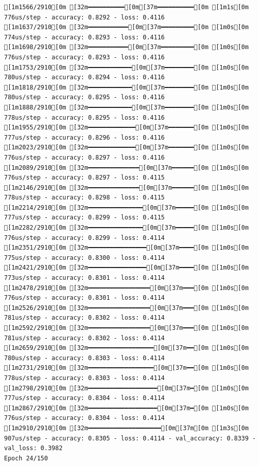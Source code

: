 \documentclass[
  letterpaper,
  DIV=11,
  numbers=noendperiod]{scrartcl}
\begin{document}
\begin{verbatim}
[1m1566/2910[0m [32m━━━━━━━━━━[0m[37m━━━━━━━━━━[0m [1m1s[0m 776us/step - accuracy: 0.8292 - loss: 0.4116
[1m1637/2910[0m [32m━━━━━━━━━━━[0m[37m━━━━━━━━━[0m [1m0s[0m 774us/step - accuracy: 0.8293 - loss: 0.4116
[1m1698/2910[0m [32m━━━━━━━━━━━[0m[37m━━━━━━━━━[0m [1m0s[0m 776us/step - accuracy: 0.8293 - loss: 0.4116
[1m1753/2910[0m [32m━━━━━━━━━━━━[0m[37m━━━━━━━━[0m [1m0s[0m 780us/step - accuracy: 0.8294 - loss: 0.4116
[1m1818/2910[0m [32m━━━━━━━━━━━━[0m[37m━━━━━━━━[0m [1m0s[0m 780us/step - accuracy: 0.8295 - loss: 0.4116
[1m1888/2910[0m [32m━━━━━━━━━━━━[0m[37m━━━━━━━━[0m [1m0s[0m 778us/step - accuracy: 0.8295 - loss: 0.4116
[1m1955/2910[0m [32m━━━━━━━━━━━━━[0m[37m━━━━━━━[0m [1m0s[0m 777us/step - accuracy: 0.8296 - loss: 0.4116
[1m2023/2910[0m [32m━━━━━━━━━━━━━[0m[37m━━━━━━━[0m [1m0s[0m 776us/step - accuracy: 0.8297 - loss: 0.4116
[1m2089/2910[0m [32m━━━━━━━━━━━━━━[0m[37m━━━━━━[0m [1m0s[0m 776us/step - accuracy: 0.8297 - loss: 0.4115
[1m2146/2910[0m [32m━━━━━━━━━━━━━━[0m[37m━━━━━━[0m [1m0s[0m 778us/step - accuracy: 0.8298 - loss: 0.4115
[1m2214/2910[0m [32m━━━━━━━━━━━━━━━[0m[37m━━━━━[0m [1m0s[0m 777us/step - accuracy: 0.8299 - loss: 0.4115
[1m2282/2910[0m [32m━━━━━━━━━━━━━━━[0m[37m━━━━━[0m [1m0s[0m 776us/step - accuracy: 0.8299 - loss: 0.4114
[1m2351/2910[0m [32m━━━━━━━━━━━━━━━━[0m[37m━━━━[0m [1m0s[0m 775us/step - accuracy: 0.8300 - loss: 0.4114
[1m2421/2910[0m [32m━━━━━━━━━━━━━━━━[0m[37m━━━━[0m [1m0s[0m 773us/step - accuracy: 0.8301 - loss: 0.4114
[1m2478/2910[0m [32m━━━━━━━━━━━━━━━━━[0m[37m━━━[0m [1m0s[0m 776us/step - accuracy: 0.8301 - loss: 0.4114
[1m2526/2910[0m [32m━━━━━━━━━━━━━━━━━[0m[37m━━━[0m [1m0s[0m 781us/step - accuracy: 0.8302 - loss: 0.4114
[1m2592/2910[0m [32m━━━━━━━━━━━━━━━━━[0m[37m━━━[0m [1m0s[0m 781us/step - accuracy: 0.8302 - loss: 0.4114
[1m2659/2910[0m [32m━━━━━━━━━━━━━━━━━━[0m[37m━━[0m [1m0s[0m 780us/step - accuracy: 0.8303 - loss: 0.4114
[1m2731/2910[0m [32m━━━━━━━━━━━━━━━━━━[0m[37m━━[0m [1m0s[0m 778us/step - accuracy: 0.8303 - loss: 0.4114
[1m2798/2910[0m [32m━━━━━━━━━━━━━━━━━━━[0m[37m━[0m [1m0s[0m 777us/step - accuracy: 0.8304 - loss: 0.4114
[1m2867/2910[0m [32m━━━━━━━━━━━━━━━━━━━[0m[37m━[0m [1m0s[0m 776us/step - accuracy: 0.8304 - loss: 0.4114
[1m2910/2910[0m [32m━━━━━━━━━━━━━━━━━━━━[0m[37m[0m [1m3s[0m 907us/step - accuracy: 0.8305 - loss: 0.4114 - val_accuracy: 0.8339 - val_loss: 0.3982
Epoch 24/150


\end{verbatim}
\end{document}
